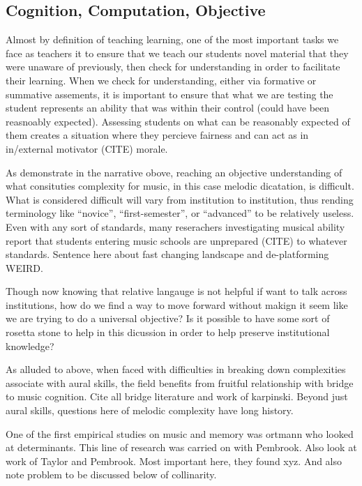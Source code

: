\documentclass[english,man,floatsintext]{apa6}
\begin{document}
\hypertarget{cognition-computation-objective}{%
\subsection{Cognition, Computation, Objective}\label{cognition-computation-objective}}

Almost by definition of teaching learning, one of the most important tasks we face as teachers it to ensure that we teach our students novel material that they were unaware of previously, then check for understanding in order to facilitate their learning.
When we check for understanding, either via formative or summative assements, it is important to ensure that what we are testing the student represents an ability that was within their control (could have been reasnoably expected).
Assessing students on what can be reasonably expected of them creates a situation where they percieve fairness and can act as in in/external motivator (CITE) morale.

As demonstrate in the narrative obove, reaching an objective understanding of what consituties complexity for music, in this case melodic dicatation, is difficult.
What is considered difficult will vary from institution to institution, thus rending terminology like \enquote{novice}, \enquote{first-semester}, or \enquote{advanced} to be relatively useless.
Even with any sort of standards, many reserachers investigating musical ability report that students entering music schools are unprepared (CITE) to whatever standards.
Sentence here about fast changing landscape and de-platforming WEIRD.

Though now knowing that relative langauge is not helpful if want to talk across institutions, how do we find a way to move forward without makign it seem like we are trying to do a universal objective?
Is it possible to have some sort of rosetta stone to help in this dicussion in order to help preserve institutional knowledge?

As alluded to above, when faced with difficulties in breaking down complexities associate with aural skills, the field benefits from fruitful relationship with bridge to music cognition.
Cite all bridge literature and work of karpinski.
Beyond just aural skills, questions here of melodic complexity have long history.

One of the first empirical studies on music and memory was ortmann who looked at determinants.
This line of research was carried on with Pembrook.
Also look at work of Taylor and Pembrook.
Most important here, they found xyz.
And also note problem to be discussed below of collinarity.
\end{document}
